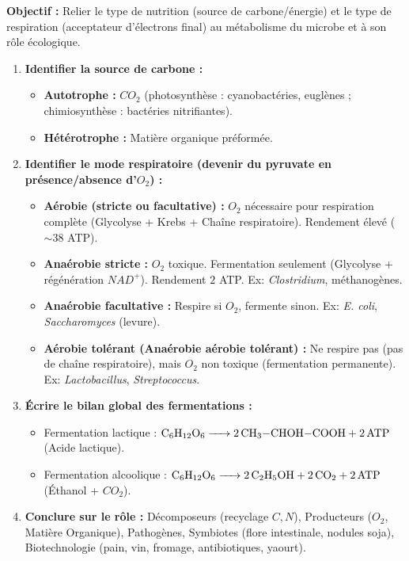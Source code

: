 \documentclass[11pt]{article}
\begin{document}
\begin{methode}
    \textbf{Objectif :} Relier le type de nutrition (source de carbone/énergie) et le type de respiration (acceptateur d'électrons final) au métabolisme du microbe et à son rôle écologique.
    \begin{enumerate}
        \item \textbf{Identifier la source de carbone :}
            \begin{itemize}
                \item \textbf{Autotrophe :} $CO_2$ (photosynthèse : cyanobactéries, euglènes ; chimiosynthèse : bactéries nitrifiantes).
                \item \textbf{Hétérotrophe :} Matière organique préformée.
            \end{itemize}
        \item \textbf{Identifier le mode respiratoire (devenir du pyruvate en présence/absence d'$O_2$) :}
            \begin{itemize}
                \item \textbf{Aérobie (stricte ou facultative) :} $O_2$ nécessaire pour respiration complète (Glycolyse + Krebs + Chaîne respiratoire). Rendement élevé ($\sim 38$ ATP).
                \item \textbf{Anaérobie stricte :} $O_2$ toxique. Fermentation seulement (Glycolyse + régénération $NAD^+$). Rendement $2$ ATP. Ex: \emph{Clostridium}, méthanogènes.
                \item \textbf{Anaérobie facultative :} Respire si $O_2$, fermente sinon. Ex: \emph{E. coli}, \emph{Saccharomyces} (levure).
                \item \textbf{Aérobie tolérant (Anaérobie aérobie tolérant) :} Ne respire pas (pas de chaîne respiratoire), mais $O_2$ non toxique (fermentation permanente). Ex: \emph{Lactobacillus}, \emph{Streptococcus}.
            \end{itemize}
        \item \textbf{Écrire le bilan global des fermentations :}
            \begin{itemize}
                \item Fermentation lactique : $\ce{C6H12O6 -> 2 CH3-CHOH-COOH + 2 ATP}$ (Acide lactique).
                \item Fermentation alcoolique : $\ce{C6H12O6 -> 2 C2H5OH + 2 CO2 + 2 ATP}$ (Éthanol + $CO_2$).
            \end{itemize}
        \item \textbf{Conclure sur le rôle :} Décomposeurs (recyclage $C, N$), Producteurs ($O_2$, Matière Organique), Pathogènes, Symbiotes (flore intestinale, nodules soja), Biotechnologie (pain, vin, fromage, antibiotiques, yaourt).
    \end{enumerate}
\end{methode}
\end{document}
